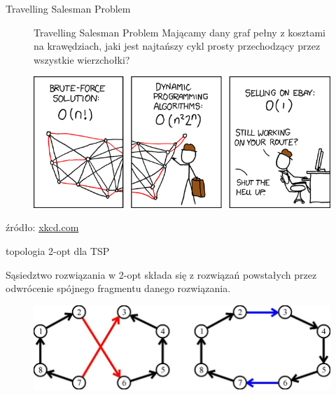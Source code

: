 \documentclass[blue]{beamer}
\begin{document}
\begin{frame}{Travelling Salesman Problem}
\begin{figure}
\begin{block}{Travelling Salesman Problem}
Mającamy dany graf pełny z kosztami na krawędziach,
jaki jest najtańszy cykl prosty przechodzący
przez wszystkie wierzchołki?
\end{block}
\includegraphics[scale=.45]{travelling_salesman_problem.png}
\end{figure}
źródło: \url{xkcd.com}
\end{frame}

\begin{frame}{topologia 2-opt dla TSP}
\begin{block}{Sąsiedztwo rozwiązania w 2-opt}
składa się z rozwiązań
powstałych przez odwrócenie spójnego
fragmentu danego rozwiązania.
\end{block}
\begin{figure}
\includegraphics[scale=.7]{2opt.jpg}
\end{figure}
\end{frame}



\end{document}

